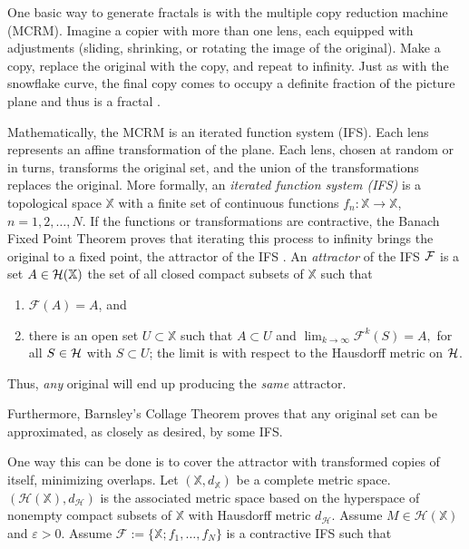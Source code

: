 \documentclass[english,11pt,letterpaper,onecolumn]{scrartcl}
\numberwithin{equation}{section}
\newcommand{\X}{\mathbb{X}}
\newcommand{\cF}{\mathcal{F}}
\newcommand{\calH}{\mathcal{H}}
\begin{document}

One basic way to generate fractals is with the multiple copy reduction
machine (MCRM). Imagine a copier with more than one lens, each equipped with
adjustments (sliding, shrinking, or rotating the image of the original). Make
a copy, replace the original with the copy, and repeat to infinity. Just as
with the snowflake curve, the final copy comes to occupy a definite fraction
of the picture plane and thus is a fractal \cite{chaosandfractals}.

Mathematically, the MCRM is an iterated function system (IFS). Each lens
represents an affine transformation of the plane. Each lens, chosen at random
or in turns, transforms the original set, and the union of the transformations
replaces the original. More formally, an \emph{iterated function system (IFS)}
is a topological space $\mathbb{X}$ with a finite set of continuous functions
$f_{n}:\X\rightarrow \X$,
$n=1,2,\dots,N$. If the functions or transformations are contractive, the
Banach Fixed Point Theorem proves that iterating this process to infinity
brings the original to a fixed point, the attractor of the IFS
\cite{chaosandfractals, barnsley1985iterated, 10.2307/24893080,
fractalseverywhere}. An \emph{attractor} of the IFS $\cal{F}$ is a set
$A\in \cal{H}(\X)$ the set of all closed compact subsets of $\X$ such that

\begin{enumerate}
\item $\cF(A)=A$, and
\item there is an open set $U\subset \X$ such that $A\subset U$ and
$\lim_{k\rightarrow\infty}\mathcal{F}^{k}(S)=A,$ for all $S\in \cal{H}$ with
$S\subset U$; the limit is with respect to the Hausdorff metric on $\cal{H}$.
\end{enumerate}

\noindent Thus, \textit{any} original will end up producing the
\textit{same} attractor.

Furthermore, Barnsley's Collage Theorem \cite{barnsley:1986:solution} proves
that any original set can be approximated, as closely as desired, by some IFS.

One way this can be done is to cover the attractor with transformed copies of
itself, minimizing overlaps. Let $(\mathbb{X},d_\mathbb{X})$ be a complete
metric space. $(\calH (\X), d_\calH)$ is the associated metric space based on
the hyperspace of nonempty compact subsets of $\X$ with Hausdorff metric
$d_\calH$. Assume $M\in\calH(\X)$ and $\varepsilon > 0$. Assume $\cF := \{\X;
f_1, \ldots, f_N\}$ is a contractive IFS such that
\end{document}
